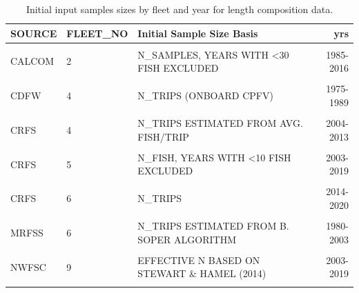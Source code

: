 \documentclass[
  english,
  a4paper,
]{article}
\begin{document}
\begin{table}

\caption{\label{tab:length-inputN}Initial input samples sizes by fleet and year for length composition data.}
\centering
\fontsize{10}{12}\selectfont
\begin{tabular}[t]{lllr}
\toprule
SOURCE & FLEET\_NO & Initial Sample Size Basis & yrs\\
\midrule
\cellcolor{gray!6}{CALCOM} & \cellcolor{gray!6}{1} & \cellcolor{gray!6}{N\_SAMPLES, YEARS WITH <30 FISH EXCLUDED} & \cellcolor{gray!6}{1983-2020}\\
CALCOM & 2 & N\_SAMPLES, YEARS WITH <30 FISH EXCLUDED & 1985-2016\\
\cellcolor{gray!6}{CALCOM} & \cellcolor{gray!6}{3} & \cellcolor{gray!6}{N\_SAMPLES, YEARS WITH <30 FISH EXCLUDED} & \cellcolor{gray!6}{1983-1998}\\
CDFW & 4 & N\_TRIPS (ONBOARD CPFV) & 1975-1989\\
\cellcolor{gray!6}{CRFS} & \cellcolor{gray!6}{4} & \cellcolor{gray!6}{N\_TRIPS} & \cellcolor{gray!6}{2014-2020}\\
CRFS & 4 & N\_TRIPS ESTIMATED FROM AVG. FISH/TRIP & 2004-2013\\
\cellcolor{gray!6}{MRFSS} & \cellcolor{gray!6}{4} & \cellcolor{gray!6}{N\_TRIPS ESTIMATED FROM B. SOPER ALGORITHM} & \cellcolor{gray!6}{1980-2003}\\
CRFS & 5 & N\_FISH, YEARS WITH <10 FISH EXCLUDED & 2003-2019\\
\cellcolor{gray!6}{CDFW} & \cellcolor{gray!6}{6} & \cellcolor{gray!6}{N\_FISH / 10} & \cellcolor{gray!6}{1978-1978}\\
CRFS & 6 & N\_TRIPS & 2014-2020\\
\cellcolor{gray!6}{CRFS} & \cellcolor{gray!6}{6} & \cellcolor{gray!6}{N\_TRIPS ESTIMATED FROM AVG. FISH/TRIP} & \cellcolor{gray!6}{2004-2013}\\
MRFSS & 6 & N\_TRIPS ESTIMATED FROM B. SOPER ALGORITHM & 1980-2003\\
\cellcolor{gray!6}{NWFSC} & \cellcolor{gray!6}{8} & \cellcolor{gray!6}{N\_SAMPLES (NUMBER OF POSITIVE DROPS)} & \cellcolor{gray!6}{2004-2019}\\
NWFSC & 9 & EFFECTIVE N  BASED ON STEWART \& HAMEL (2014) & 2003-2019\\
\cellcolor{gray!6}{CDFW} & \cellcolor{gray!6}{11} & \cellcolor{gray!6}{N\_FISH / 10} & \cellcolor{gray!6}{1975-1979}\\
\bottomrule
\end{tabular}
\end{table}
\end{document}
